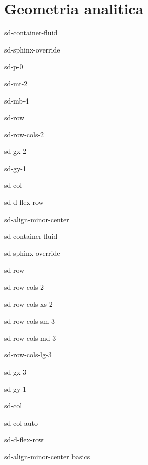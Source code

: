 \documentclass[letterpaper,10pt,italian]{jupyterBook}
\begin{document}
\part{Geometria analitica}

\sphinxstepscope

\begin{sphinxuseclass}{sd-container-fluid}
\begin{sphinxuseclass}{sd-sphinx-override}
\begin{sphinxuseclass}{sd-p-0}
\begin{sphinxuseclass}{sd-mt-2}
\begin{sphinxuseclass}{sd-mb-4}
\begin{sphinxuseclass}{sd-row}
\begin{sphinxuseclass}{sd-row-cols-2}
\begin{sphinxuseclass}{sd-gx-2}
\begin{sphinxuseclass}{sd-gy-1}
\begin{sphinxuseclass}{sd-col}
\begin{sphinxuseclass}{sd-d-flex-row}
\begin{sphinxuseclass}{sd-align-minor-center}
\begin{sphinxuseclass}{sd-container-fluid}
\begin{sphinxuseclass}{sd-sphinx-override}
\begin{sphinxuseclass}{sd-row}
\begin{sphinxuseclass}{sd-row-cols-2}
\begin{sphinxuseclass}{sd-row-cols-xs-2}
\begin{sphinxuseclass}{sd-row-cols-sm-3}
\begin{sphinxuseclass}{sd-row-cols-md-3}
\begin{sphinxuseclass}{sd-row-cols-lg-3}
\begin{sphinxuseclass}{sd-gx-3}
\begin{sphinxuseclass}{sd-gy-1}
\begin{sphinxuseclass}{sd-col}
\begin{sphinxuseclass}{sd-col-auto}
\begin{sphinxuseclass}{sd-d-flex-row}
\begin{sphinxuseclass}{sd-align-minor-center}
\sphinxAtStartPar
basics


\end{sphinxuseclass}
\end{sphinxuseclass}
\end{sphinxuseclass}
\end{sphinxuseclass}
\end{sphinxuseclass}
\end{sphinxuseclass}
\end{sphinxuseclass}
\end{sphinxuseclass}
\end{sphinxuseclass}
\end{sphinxuseclass}
\end{sphinxuseclass}
\end{sphinxuseclass}
\end{sphinxuseclass}
\end{sphinxuseclass}
\end{sphinxuseclass}
\end{sphinxuseclass}
\end{sphinxuseclass}
\end{sphinxuseclass}
\end{sphinxuseclass}
\end{sphinxuseclass}
\end{sphinxuseclass}
\end{sphinxuseclass}
\end{sphinxuseclass}
\end{sphinxuseclass}
\end{sphinxuseclass}
\end{sphinxuseclass}
\end{document}
